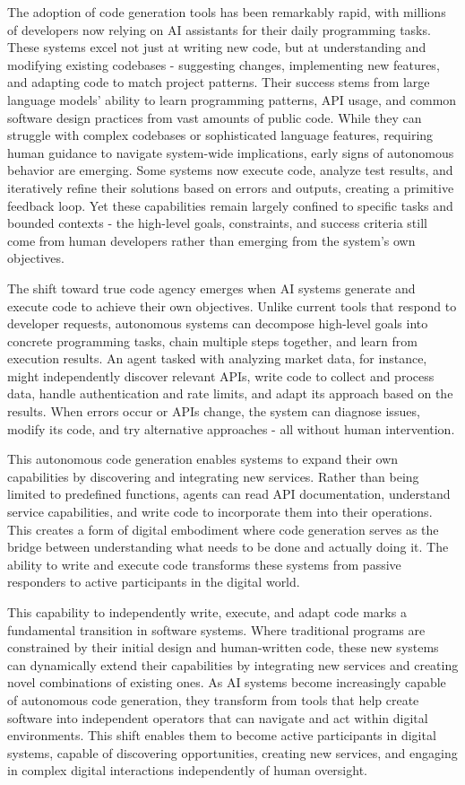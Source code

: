 \documentclass{article}
\begin{document}
The adoption of code generation tools has been remarkably rapid, with millions of developers now relying on AI assistants for their daily programming tasks\cite{github2024survey}. These systems excel not just at writing new code, but at understanding and modifying existing codebases - suggesting changes, implementing new features, and adapting code to match project patterns. Their success stems from large language models' ability to learn programming patterns, API usage, and common software design practices from vast amounts of public code. While they can struggle with complex codebases or sophisticated language features, requiring human guidance to navigate system-wide implications, early signs of autonomous behavior are emerging. Some systems now execute code, analyze test results, and iteratively refine their solutions based on errors and outputs, creating a primitive feedback loop\cite{replit2024agent}\cite{windsurf}. Yet these capabilities remain largely confined to specific tasks and bounded contexts - the high-level goals, constraints, and success criteria still come from human developers rather than emerging from the system's own objectives.

The shift toward true code agency emerges when AI systems generate and execute code to achieve their own objectives. Unlike current tools that respond to developer requests, autonomous systems can decompose high-level goals into concrete programming tasks, chain multiple steps together, and learn from execution results. An agent tasked with analyzing market data, for instance, might independently discover relevant APIs, write code to collect and process data, handle authentication and rate limits, and adapt its approach based on the results. When errors occur or APIs change, the system can diagnose issues, modify its code, and try alternative approaches - all without human intervention.

This autonomous code generation enables systems to expand their own capabilities by discovering and integrating new services. Rather than being limited to predefined functions, agents can read API documentation, understand service capabilities, and write code to incorporate them into their operations. This creates a form of digital embodiment where code generation serves as the bridge between understanding what needs to be done and actually doing it. The ability to write and execute code transforms these systems from passive responders to active participants in the digital world.

This capability to independently write, execute, and adapt code marks a fundamental transition in software systems. Where traditional programs are constrained by their initial design and human-written code, these new systems can dynamically extend their capabilities by integrating new services and creating novel combinations of existing ones. As AI systems become increasingly capable of autonomous code generation, they transform from tools that help create software into independent operators that can navigate and act within digital environments. This shift enables them to become active participants in digital systems, capable of discovering opportunities, creating new services, and engaging in complex digital interactions independently of human oversight.
\end{document}
